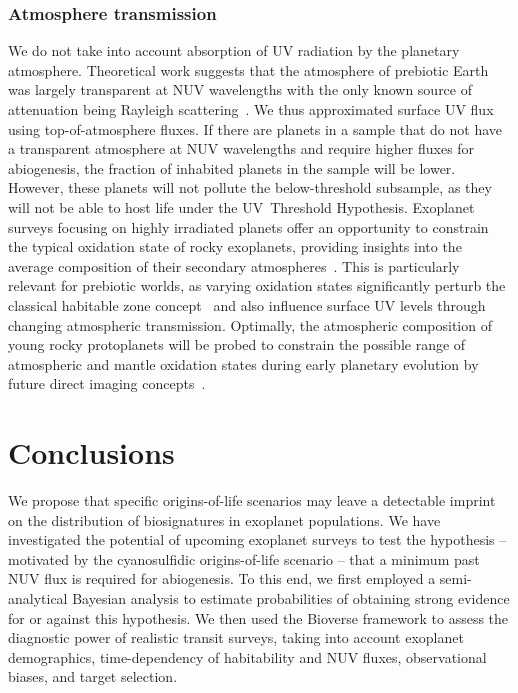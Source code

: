 \documentclass[twocolumn,twocolappendix,linenumbers]{aastex631}
\begin{document}
\subsubsection{Atmosphere transmission}
We do not take into account absorption of \gls{UV} radiation by the planetary atmosphere.
Theoretical work suggests that the atmosphere of prebiotic Earth was largely transparent at \gls{NUV} wavelengths with the only known source of attenuation being Rayleigh scattering~\citep{Ranjan2017,Ranjan2017c}.
We thus approximated surface \gls{UV} flux using top-of-atmosphere fluxes.
If there are planets in a sample that do not have a transparent atmosphere at \gls{NUV} wavelengths and require higher fluxes for abiogenesis, the fraction of inhabited planets in the sample will be lower.
However, these planets will not pollute the below-threshold subsample, as they will not be able to host life under the UV~Threshold Hypothesis.
Exoplanet surveys focusing on highly irradiated planets offer an opportunity to constrain the typical oxidation state of rocky exoplanets, providing insights into the average composition of their secondary atmospheres~\citep{Lichtenberg2024}.
This is particularly relevant for prebiotic worlds, as varying oxidation states significantly perturb the classical habitable zone concept~\citep{Nicholls2024} and also influence surface \gls{UV} levels through changing atmospheric transmission.
Optimally, the atmospheric composition of young rocky protoplanets will be probed to constrain the possible range of atmospheric and mantle oxidation states during early planetary evolution by future direct imaging concepts~\citep{Cesario2024}.



\section{Conclusions}
\label{sec:conclusions}
We propose that specific origins-of-life scenarios may leave a detectable imprint on the distribution of biosignatures in exoplanet populations.
We have investigated the potential of upcoming exoplanet surveys to test the hypothesis -- motivated by the cyanosulfidic origins-of-life scenario -- that a minimum past \gls{NUV} flux is required for abiogenesis.
To this end, we first employed a semi-analytical Bayesian analysis to estimate probabilities of obtaining strong evidence for or against this hypothesis.
We then used the Bioverse framework to assess the diagnostic power of realistic transit surveys, taking into account exoplanet demographics, time-dependency of habitability and \gls{NUV} fluxes, observational biases, and target selection.
\end{document}
